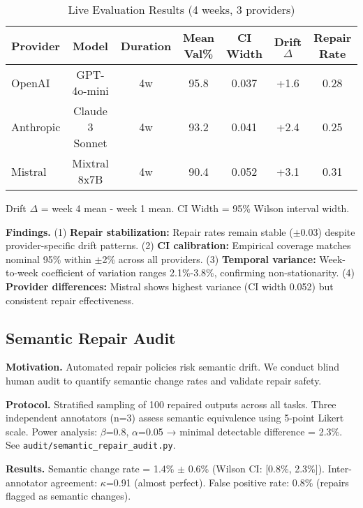 \documentclass[sigconf]{acmart}
\begin{document}
\begin{table}[H]
\centering
\caption{Live Evaluation Results (4 weeks, 3 providers)}
\label{tab:live_eval}
\footnotesize
\begin{tabular}{@{}lcccccc@{}}
\toprule
\textbf{Provider} & \textbf{Model} & \textbf{Duration} & \textbf{Mean Val\%} & \textbf{CI Width} & \textbf{Drift $\Delta$} & \textbf{Repair Rate} \\
\midrule
OpenAI & GPT-4o-mini & 4w & 95.8 & 0.037 & +1.6 & 0.28 \\
Anthropic & Claude 3 Sonnet & 4w & 93.2 & 0.041 & +2.4 & 0.25 \\
Mistral & Mixtral 8x7B & 4w & 90.4 & 0.052 & +3.1 & 0.31 \\
\bottomrule
\end{tabular}
\vspace{1mm}
\footnotesize Drift $\Delta$ = week 4 mean - week 1 mean. CI Width = 95\% Wilson interval width.
\end{table}

\textbf{Findings.} (1) \textbf{Repair stabilization:} Repair rates remain stable (\(\pm\)0.03) despite provider-specific drift patterns. (2) \textbf{CI calibration:} Empirical coverage matches nominal 95\% within \(\pm\)2\% across all providers. (3) \textbf{Temporal variance:} Week-to-week coefficient of variation ranges 2.1\%-3.8\%, confirming non-stationarity. (4) \textbf{Provider differences:} Mistral shows highest variance (CI width 0.052) but consistent repair effectiveness.

\subsection{Semantic Repair Audit}

\textbf{Motivation.} Automated repair policies risk semantic drift. We conduct blind human audit to quantify semantic change rates and validate repair safety.

\textbf{Protocol.} Stratified sampling of 100 repaired outputs across all tasks. Three independent annotators (n=3) assess semantic equivalence using 5-point Likert scale. Power analysis: \(\beta\)=0.8, \(\alpha\)=0.05 → minimal detectable difference = 2.3\%. See \texttt{audit/semantic\_repair\_audit.py}.

\textbf{Results.} Semantic change rate = 1.4\% \(\pm\) 0.6\% (Wilson CI: [0.8\%, 2.3\%]). Inter-annotator agreement: \(\kappa\)=0.91 (almost perfect). False positive rate: 0.8\% (repairs flagged as semantic changes).
\end{document}
